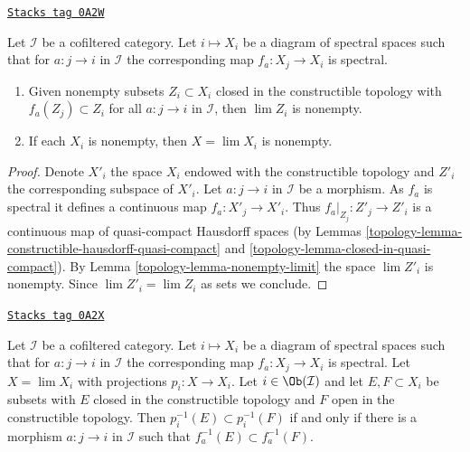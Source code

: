 \begin{lemma}
\label{topology-lemma-inverse-limit-spectral-spaces-nonempty}
\href{https://stacks.math.columbia.edu/tag/0A2W}{\texttt{Stacks tag 0A2W}}

Let $\mathcal{I}$ be a cofiltered category. Let $i \mapsto X_i$ be a diagram
of spectral spaces such that for $a : j \to i$ in $\mathcal{I}$
the corresponding map $f_a : X_j \to X_i$ is spectral.
\begin{enumerate}
\item Given nonempty subsets $Z_i \subset X_i$ closed in the constructible
topology with $f_a(Z_j) \subset Z_i$ for all $a : j \to i$ in $\mathcal{I}$,
then $\lim Z_i$ is nonempty.
\item If each $X_i$ is nonempty, then $X = \lim X_i$ is nonempty.
\end{enumerate}
\end{lemma}

\begin{proof}

Denote $X'_i$ the space $X_i$ endowed with the constructible topology
and $Z'_i$ the corresponding subspace of $X'_i$.
Let $a : j \to i$ in $\mathcal{I}$ be a morphism. As $f_a$ is spectral
it defines a continuous map $f_a : X'_j \to X'_i$. Thus
$f_a|_{Z_j} : Z'_j \to Z'_i$ is a continuous map of quasi-compact
Hausdorff spaces (by
Lemmas \ref{topology-lemma-constructible-hausdorff-quasi-compact} and
\ref{topology-lemma-closed-in-quasi-compact}). By
Lemma \ref{topology-lemma-nonempty-limit} the space $\lim Z'_i$ is nonempty.
Since $\lim Z'_i = \lim Z_i$ as sets we conclude.
\end{proof}

\begin{lemma}
\label{topology-lemma-inverse-limit-spectral-spaces-equal}
\href{https://stacks.math.columbia.edu/tag/0A2X}{\texttt{Stacks tag 0A2X}}

Let $\mathcal{I}$ be a cofiltered category. Let $i \mapsto X_i$ be a diagram
of spectral spaces such that for $a : j \to i$ in $\mathcal{I}$
the corresponding map $f_a : X_j \to X_i$ is spectral. Let $X = \lim X_i$
with projections $p_i : X \to X_i$. Let $i \in \Ob(\mathcal{I})$ and let
$E, F \subset X_i$ be subsets with $E$ closed in the constructible topology
and $F$ open in the constructible topology.
Then $p_i^{-1}(E) \subset p_i^{-1}(F)$ if and only if there is a morphism
$a : j \to i$ in $\mathcal{I}$ such that $f_a^{-1}(E) \subset f_a^{-1}(F)$.
\end{lemma}

